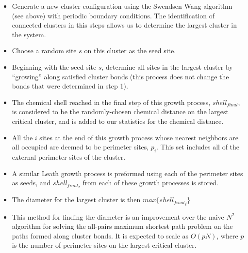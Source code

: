\documentclass[11pt]{article}
\begin{document}
\begin{itemize}

\item Generate a new cluster configuration using the Swendsen-Wang algorithm (see above) with periodic boundary conditions. The identification of connected clusters in this steps allows us to determine the largest cluster in the system.\\
\label{sec-4.2.3.1}


\item Choose a random site $s$ on this cluster as the seed site.\\
\label{sec-4.2.3.2}


\item Beginning with the seed site $s$, determine all sites in the largest cluster by ``growing'' along satisfied cluster bonds (this process does not change the bonds that were determined in step 1).\\
\label{sec-4.2.3.3}


\item The chemical shell reached in the final step of this growth process, $shell_{final}$, is considered to be the randomly-chosen chemical distance on the largest critical cluster, and is added to our statistics for the chemical distance.\\
\label{sec-4.2.3.4}


\item All the $i$ sites at the end of this growth process whose nearest neighbors are all occupied are deemed to be perimeter sites, $p_i$.  This set includes all of the external perimeter sites of the cluster.\\
\label{sec-4.2.3.5}


\item A similar Leath growth process is preformed using each of the perimeter sites as seeds, and ${shell_{final}}_i$ from each of these growth processes is stored.\\
\label{sec-4.2.3.6}


\item The diameter for the largest cluster is then $max\{{shell_{final}}_i\}$\\
\label{sec-4.2.3.7}


\item This method for finding the diameter is an improvement over the naive $N^2$ algorithm for solving the all-pairs maximum shortest path problem on the paths formed along cluster bonds. It is expected to scale as $O(pN)$, where $p$ is the number of perimeter sites on the largest critical cluster.\\
\label{sec-4.2.3.8}

\end{itemize} %
\end{document}
